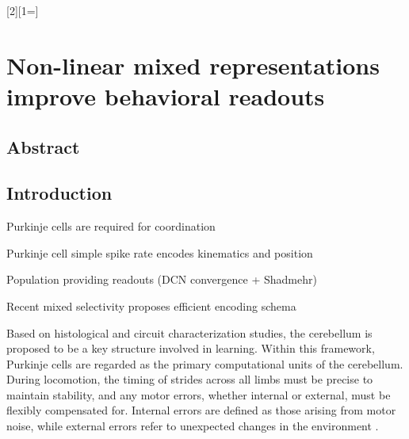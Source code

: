 
%
\label{cha:neurobehav}

[2][1=]{}

\chapter{Non-linear mixed representations improve behavioral readouts} 

\pagebreak

\section{Abstract}


\section{Introduction}


\begin{compactitem}
    \scriptsize
    \item Purkinje cells are required for coordination
    \item Purkinje cell simple spike rate encodes kinematics and position
    \item Population providing readouts (DCN convergence + Shadmehr)
    \item Recent mixed selectivity proposes efficient encoding schema
\end{compactitem}

\vspace{10pt}

Based on histological and circuit characterization studies, the cerebellum is proposed to be a key structure involved in learning. Within this framework, Purkinje cells are regarded as the primary computational units of the cerebellum.
During locomotion, the timing of strides across all limbs must be precise to maintain stability, and any motor errors, whether internal or external, must be flexibly compensated for. Internal errors are defined as those arising from motor noise, while external errors refer to unexpected changes in the environment \cite{wolpert_internal_1995}.

